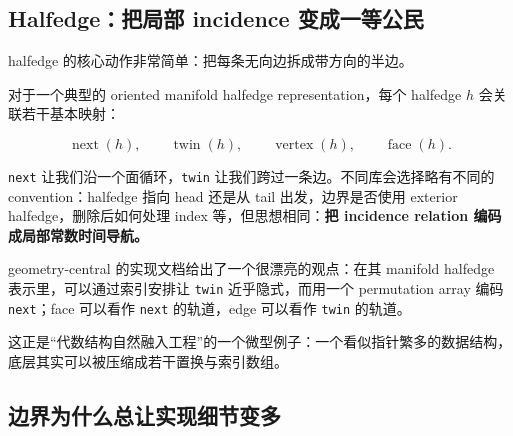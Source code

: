 \documentclass[UTF8,11pt]{ctexart}
\newcommand{\code}[1]{\texttt{#1}}
\begin{document}
\subsection{Halfedge：把局部 incidence 变成一等公民}

halfedge 的核心动作非常简单：把每条无向边拆成带方向的半边。

对于一个典型的 oriented manifold halfedge representation，每个 halfedge $h$ 会关联若干基本映射：

\[
\operatorname{next}(h),\qquad
\operatorname{twin}(h),\qquad
\operatorname{vertex}(h),\qquad
\operatorname{face}(h).
\]

\begin{center}
\end{center}

\code{next} 让我们沿一个面循环，\code{twin} 让我们跨过一条边。不同库会选择略有不同的 convention：halfedge 指向 head 还是从 tail 出发，边界是否使用 exterior halfedge，删除后如何处理 index 等，但思想相同：\textbf{把 incidence relation 编码成局部常数时间导航。}

\begin{sidenote}
geometry-central 的实现文档给出了一个很漂亮的观点：在其 manifold halfedge 表示里，可以通过索引安排让 \code{twin} 近乎隐式，而用一个 permutation array 编码 \code{next}；face 可以看作 \code{next} 的轨道，edge 可以看作 \code{twin} 的轨道。

这正是“代数结构自然融入工程”的一个微型例子：一个看似指针繁多的数据结构，底层其实可以被压缩成若干置换与索引数组。
\end{sidenote}

\subsection{边界为什么总让实现细节变多}
\end{document}
